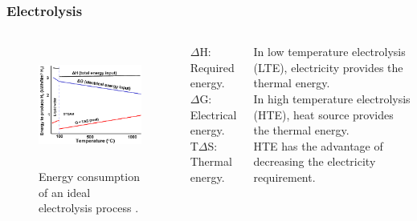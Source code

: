 \begin{frame}
\frametitle{Electrolysis}
\begin{columns}
    \column[t]{5cm}
	\begin{figure}[htbp!]
		\begin{center}
			\includegraphics[height=4.0cm]{images/ele-curve.png}
		\end{center}
		\caption{Energy consumption of an ideal electrolysis process \cite{hi2h2_highly_2007}.}
	\end{figure}

	\column[t]{5cm}
	$\Delta$H: Required energy.
	\\
	$\Delta$G: Electrical energy.
	\\
	T$\Delta$S: Thermal energy. \vspace{0.7cm}

    In low temperature electrolysis (LTE), electricity provides the thermal energy.
    \\
    In high temperature electrolysis (HTE), heat source provides the thermal energy.
    \\
    HTE has the advantage of decreasing the electricity requirement.
    
\end{columns}
\end{frame}


